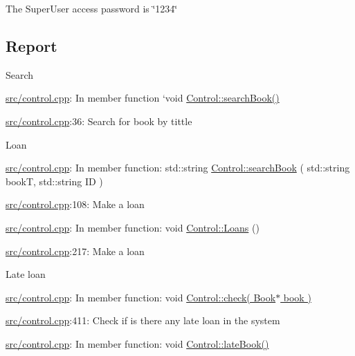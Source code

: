 


\begin{DoxyItemize}
\item The Super\+User access password is \char`\"{}1234\char`\"{}
\end{DoxyItemize}

\subsection*{Report}


\begin{DoxyItemize}
\item Search

\hyperlink{control_8cpp}{src/control.\+cpp}\+: In member function ‘void \hyperlink{classControl_a8b6c2e30e71b54786b3ec01e8524076f}{Control\+::search\+Book()}\textquotesingle{}

\hyperlink{control_8cpp}{src/control.\+cpp}\+:36\+: Search for book by tittle
\item Loan

\hyperlink{control_8cpp}{src/control.\+cpp}\+: In member function\+: \textquotesingle{}std\+::string \hyperlink{classControl_a7719518366f488614467555e53a6d0c2}{Control\+::search\+Book} ( std\+::string bookT, std\+::string ID )\textquotesingle{}

\hyperlink{control_8cpp}{src/control.\+cpp}\+:108\+: Make a loan

\hyperlink{control_8cpp}{src/control.\+cpp}\+: In member function\+: \textquotesingle{}void \hyperlink{classControl_ad413782c762539562d2ff9401a54eab3}{Control\+::\+Loans} ()\textquotesingle{}

\hyperlink{control_8cpp}{src/control.\+cpp}\+:217\+: Make a loan
\item Late loan

\hyperlink{control_8cpp}{src/control.\+cpp}\+: In member function\+: \textquotesingle{}void \hyperlink{classControl_a234ad2973e4ad1e4cb9099f75dbdb05f}{Control\+::check( Book$\ast$ book )}\textquotesingle{}

\hyperlink{control_8cpp}{src/control.\+cpp}\+:411\+: Check if is there any late loan in the system

\hyperlink{control_8cpp}{src/control.\+cpp}\+: In member function\+: \textquotesingle{}void \hyperlink{classControl_a94a103e37a13e4bbf4ca7c4a979306bf}{Control\+::late\+Book()}\textquotesingle{}


\end{DoxyItemize}
